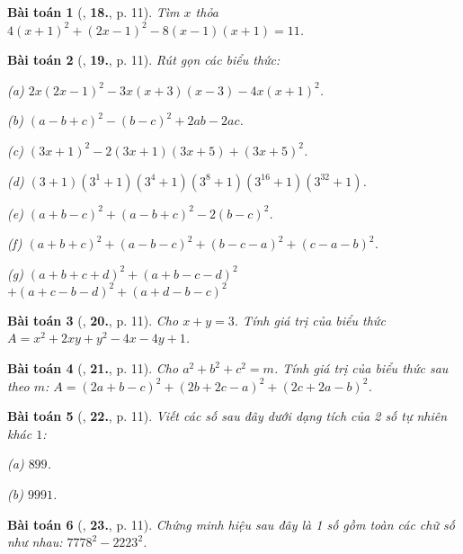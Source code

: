 \documentclass{article}
\numberwithin{equation}{section}
\newtheorem{baitoan}{Bài toán}[section]
\begin{document}
\begin{baitoan}[\cite{Binh_Toan_8_tap_1}, \textbf{18.}, p. 11]
	Tìm $x$ thỏa $4(x + 1)^2 + (2x - 1)^2 - 8(x - 1)(x + 1) = 11$.
\end{baitoan}

\begin{baitoan}[\cite{Binh_Toan_8_tap_1}, \textbf{19.}, p. 11]
	Rút gọn các biểu thức:
	\begin{enumerate*}
		\item[(a)] $2x(2x - 1)^2 - 3x(x + 3)(x - 3) - 4x(x + 1)^2$.
		\item[(b)] $(a - b + c)^2  - (b - c)^2 + 2ab - 2ac$.
		\item[(c)] $(3x + 1)^2 - 2(3x + 1)(3x + 5) + (3x + 5)^2$.
		\item[(d)] $(3 + 1)(3^1 + 1)(3^4 + 1)(3^8 + 1)(3^{16} + 1)(3^{32} + 1)$.
		\item[(e)] $(a + b - c)^2 + (a - b + c)^2 - 2(b - c)^2$.
		\item[(f)] $(a + b + c)^2 + (a - b - c)^2 + (b - c - a)^2 + (c - a - b)^2$.
		\item[(g)] $(a + b + c + d)^2 + (a + b - c - d)^2$ $+ (a + c - b - d)^2 + (a + d - b - c)^2$
	\end{enumerate*}
\end{baitoan}

\begin{baitoan}[\cite{Binh_Toan_8_tap_1}, \textbf{20.}, p. 11]
	Cho $x + y = 3$. Tính giá trị của biểu thức $A = x^2 + 2xy + y^2 - 4x - 4y + 1$.
\end{baitoan}

\begin{baitoan}[\cite{Binh_Toan_8_tap_1}, \textbf{21.}, p. 11]
	Cho $a^2 + b^2 + c^2 = m$. Tính giá trị của biểu thức sau theo $m$: $A = (2a + b - c)^2 + (2b + 2c - a)^2 + (2c + 2a - b)^2$.
\end{baitoan}

\begin{baitoan}[\cite{Binh_Toan_8_tap_1}, \textbf{22.}, p. 11]
	Viết các số sau đây dưới dạng tích của 2 số tự nhiên khác $1$:
	\begin{enumerate*}
		\item[(a)] $899$.
		\item[(b)] $9991$.
	\end{enumerate*}
\end{baitoan}

\begin{baitoan}[\cite{Binh_Toan_8_tap_1}, \textbf{23.}, p. 11]
	Chứng minh hiệu sau đây là 1 số gồm toàn các chữ số như nhau: $7778^2 - 2223^2$.
\end{baitoan}
\end{document}
